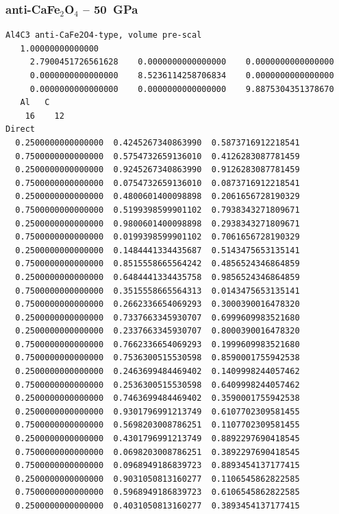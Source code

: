 \subsubsection*{anti-CaFe$_2$O$_4$ -- 50~GPa}
\begin{footnotesize}
\begin{verbatim}
Al4C3 anti-CaFe2O4-type, volume pre-scal
   1.00000000000000     
     2.7900451726561628    0.0000000000000000    0.0000000000000000
     0.0000000000000000    8.5236114258706834    0.0000000000000000
     0.0000000000000000    0.0000000000000000    9.8875304351378670
   Al   C 
    16    12
Direct
  0.2500000000000000  0.4245267340863990  0.5873716912218541
  0.7500000000000000  0.5754732659136010  0.4126283087781459
  0.2500000000000000  0.9245267340863990  0.9126283087781459
  0.7500000000000000  0.0754732659136010  0.0873716912218541
  0.2500000000000000  0.4800601400098898  0.2061656728190329
  0.7500000000000000  0.5199398599901102  0.7938343271809671
  0.2500000000000000  0.9800601400098898  0.2938343271809671
  0.7500000000000000  0.0199398599901102  0.7061656728190329
  0.2500000000000000  0.1484441334435687  0.5143475653135141
  0.7500000000000000  0.8515558665564242  0.4856524346864859
  0.2500000000000000  0.6484441334435758  0.9856524346864859
  0.7500000000000000  0.3515558665564313  0.0143475653135141
  0.7500000000000000  0.2662336654069293  0.3000390016478320
  0.2500000000000000  0.7337663345930707  0.6999609983521680
  0.2500000000000000  0.2337663345930707  0.8000390016478320
  0.7500000000000000  0.7662336654069293  0.1999609983521680
  0.7500000000000000  0.7536300515530598  0.8590001755942538
  0.2500000000000000  0.2463699484469402  0.1409998244057462
  0.7500000000000000  0.2536300515530598  0.6409998244057462
  0.2500000000000000  0.7463699484469402  0.3590001755942538
  0.2500000000000000  0.9301796991213749  0.6107702309581455
  0.7500000000000000  0.5698203008786251  0.1107702309581455
  0.2500000000000000  0.4301796991213749  0.8892297690418545
  0.7500000000000000  0.0698203008786251  0.3892297690418545
  0.7500000000000000  0.0968949186839723  0.8893454137177415
  0.2500000000000000  0.9031050813160277  0.1106545862822585
  0.7500000000000000  0.5968949186839723  0.6106545862822585
  0.2500000000000000  0.4031050813160277  0.3893454137177415
 

\end{verbatim}
\end{footnotesize}

